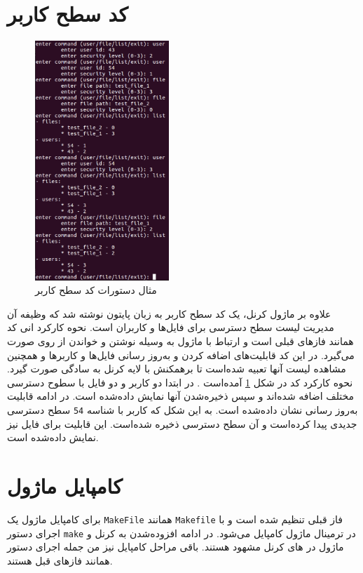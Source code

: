 \documentclass[13pt]{article}
\begin{document}
     \section{کد سطح کاربر}
     \begin{figure}
     	\centering
     	\vspace{-0.5cm}
     	\includegraphics[width=0.45\textwidth]{screenshots/communicationWithKernel.png}
     	\caption{مثال دستورات کد سطح کاربر}
     	\vspace{-50pt}
     	\label{f1}
     \end{figure}
     علاوه بر ماژول کرنل، یک کد سطح کاربر به زبان پایتون نوشته شد که وظیفه آن مدیریت لیست سطح دسترسی برای فایل‌ها و کاربران است. نحوه کارکرد انی کد همانند فاز‌های قبلی است و ارتباط با ماژول به وسیله نوشتن و خواندن از روی
      صورت می‌گیرد. در این کد قابلیت‌های اضافه کردن و به‌روز رسانی فایل‌ها و کاربرها و همچنین مشاهده لیست آنها تعبیه شده‌است تا برهمکنش با لایه کرنل به سادگی صورت گیرد. نحوه کارکرد کد در شکل
      \ref{f1}
       آمده‌است . در ابتدا دو کاربر و دو فایل با سطوح دسترسی مختلف اضافه شده‌اند و سپس ذخیره‌شدن آنها نمایش داده‌شده است. در ادامه قابلیت به‌روز رسانی نشان‌ داده‌شده است. به این شکل که کاربر با شناسه \texttt{54} سطح دسترسی جدیدی پیدا کرده‌است و آن سطح دسترسی ذخیره شده‌است. این قابلیت برای فایل نیز نمایش داده‌شده است.
      \section{کامپایل ماژول}
      برای کامپایل ماژول یک \texttt{MakeFile} همانند \texttt{Makefile} فاز قبلی تنظیم شده است و با اجرای دستور \texttt{make} در ترمینال ماژول کامپایل می‌شود. در ادامه افزوده‌شدن به کرنل و 
      ماژول در 
      های کرنل مشهود هستند. باقی مراحل کامپایل نیز من جمله اجرای دستور 
      همانند فازهای قبل هستند.
\end{document}
